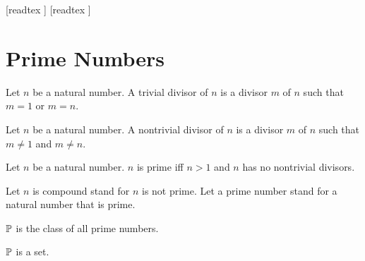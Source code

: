 \documentclass[10pt]{article}
\begin{document}
  \begin{imports}
    \begin{forthel}
      [readtex ]
      [readtex ]
    \end{forthel}
  \end{imports}


  \section{Prime Numbers}

  \begin{forthel}
    \begin{definition}
      Let $n$ be a natural number.
      A trivial divisor of $n$ is a divisor $m$ of $n$ such that $m = 1$ or
      $m = n$.
    \end{definition}
  \end{forthel}

  \begin{forthel}
    \begin{definition}
      Let $n$ be a natural number.
      A nontrivial divisor of $n$ is a divisor $m$ of $n$ such that $m \neq 1$
      and $m \neq n$.
    \end{definition}
  \end{forthel}

  \begin{forthel}
    \begin{definition}
      Let $n$ be a natural number.
      $n$ is prime iff $n > 1$ and $n$ has no nontrivial divisors.
    \end{definition}

    Let $n$ is compound stand for $n$ is not prime.
    Let a prime number stand for a natural number that is prime.
  \end{forthel}

  \begin{forthel}
    \begin{definition}
      $\mathbb{P}$ is the class of all prime numbers.
    \end{definition}
  \end{forthel}

  \begin{forthel}
    \begin{proposition}
      $\mathbb{P}$ is a set.
    \end{proposition}
  \end{forthel}
\end{document}
